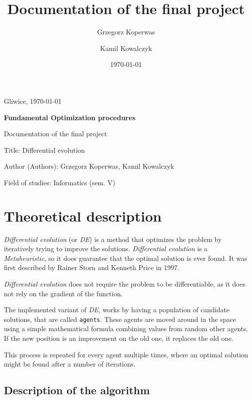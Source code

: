 \documentclass[a4paper,12pt]{article}
\title{Documentation of the final project}
\author{Grzegorz Koperwas \and Kamil Kowalczyk}
\date{\today}
\begin{document}
\begin{flushright}
Gliwice, \today
\end{flushright}

\vspace{1cm}

\begin{large}
\textbf{Fundamental Optimization procedures}

\vspace{5mm}

Documentation of the final project
\end{large}

\vspace{10mm}

Title: Differential evolution

\vspace{5mm}

Author (Authors): Grzegorz Koperwas, Kamil Kowalczyk

\vspace{5mm}

Field of studies: Informatics (sem. V)

\vspace{2cm}

\section*{Theoretical description}

\emph{Differential evolution} (or \emph{DE}) is a method that optimizes the
problem by iteratively trying to improve the solutions. \emph{Differential evolution}
is a \emph{Metaheuristic}, so it does guarantee that the optimal solution is 
ever found. It was first described by Rainer Storn and Kenneth Price in 1997.

\emph{Differential evolution} does not require the problem to be differentiable,
as it does not rely on the gradient of the function.

The implemented variant of \emph{DE}, works by having a population of
candidate solutions, that are called \texttt{agents}. These agents are moved 
around in the space using a simple mathematical formula combining values from 
random other agents. If the new position is an improvement on the old one, it 
replaces the old one.

This process is repeated for every agent multiple times, where an optimal
solution might be found after a number of iterations.

\subsection*{Description of the algorithm}
\end{document}
